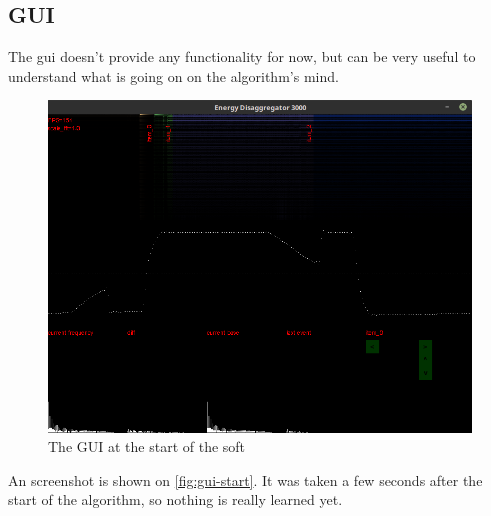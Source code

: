 \subsection{GUI}
The \acrlong{gui} doesn't provide any functionality for now, but can be very useful to understand what is going on on the algorithm's mind.
\begin{figure}[t]
    \centering
    \includegraphics[width=\textwidth]{img/gui-start.png}
    \caption{The GUI at the start of the soft}
    \label{fig:gui-start}
\end{figure}
An screenshot is shown on \autoref{fig:gui-start}. It was taken a few seconds after the start of the algorithm, so nothing is really learned yet.

